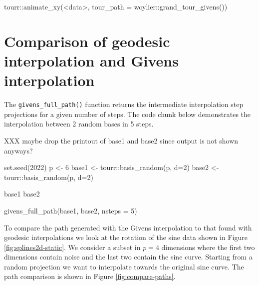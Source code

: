 \begin{Schunk}
\begin{Sinput}
tourr::animate_xy(<data>, tour_path = woylier::grand_tour_givens())
\end{Sinput}
\end{Schunk}

\hypertarget{comparison-of-geodesic-interpolation-and-givens-interpolation}{%
\section{Comparison of geodesic interpolation and Givens
interpolation}\label{comparison-of-geodesic-interpolation-and-givens-interpolation}}

The \texttt{givens\_full\_path()} function returns the intermediate
interpolation step projections for a given number of steps. The code
chunk below demonstrates the interpolation between 2 random bases in 5
steps.

XXX maybe drop the printout of base1 and base2 since output is not shown
anyways?

\begin{Schunk}
\begin{Sinput}
set.seed(2022)
p <- 6
base1 <- tourr::basis_random(p, d=2)
base2 <- tourr::basis_random(p, d=2)

base1
base2
\end{Sinput}
\end{Schunk}

\begin{Schunk}
\begin{Sinput}
givens_full_path(base1, base2, nsteps = 5)
\end{Sinput}
\end{Schunk}

To compare the path generated with the Givens interpolation to that
found with geodesic interpolations we look at the rotation of the sine
data shown in Figure \ref{fig:splines2d-static}. We consider a subset in
\(p=4\) dimensions where the first two dimensions contain noise and the
last two contain the sine curve. Starting from a random projection we
want to interpolate towards the original sine curve. The path comparison
is shown in Figure \ref{fig:compare-paths}.

